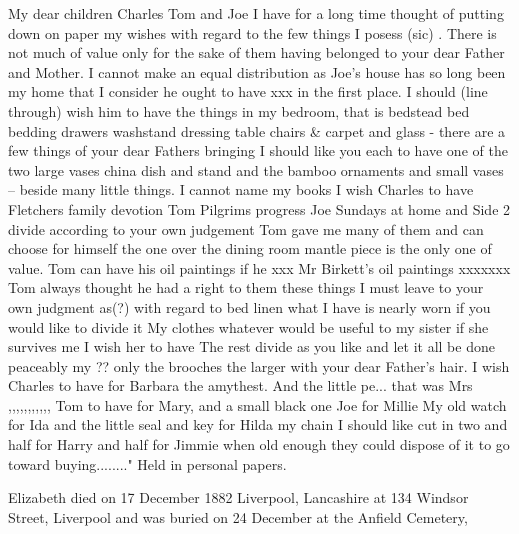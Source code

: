 My dear children Charles Tom and Joe I have for a long time thought of putting down on paper my wishes with regard to the few things I posess (sic) . There is not much of value only for the sake of them having belonged to your dear Father and Mother. I cannot make an equal distribution as Joe’s house has so long been my home that I consider he ought to have xxx in the first place. I should (line through) wish him to have the things in my bedroom, that is bedstead bed bedding drawers washstand dressing table chairs & carpet and glass - there are a few things of your dear Fathers bringing I should like you each to have one of the two large vases china dish and stand and the bamboo ornaments and small vases – beside many little things. I cannot name my books I wish Charles to have Fletchers family devotion Tom Pilgrims progress Joe Sundays at home and
Side 2
divide according to your own judgement Tom gave me many of them and can choose for himself the one over the dining room mantle piece is the only one of value. Tom can have his oil paintings if he xxx Mr Birkett’s oil paintings xxxxxxx Tom always thought he had a right to them these things I must leave to your own judgment as(?) with regard to bed linen what I have is nearly worn if you would like to divide it My clothes whatever would be useful to my sister if she survives me I wish her to have The rest divide as you like and let it all be done peaceably my ?? only the brooches the larger with your dear Father’s hair. I wish Charles to have for Barbara the amythest. And the little pe... that was Mrs ,,,,,,,,,,, Tom to have for Mary, and a small black one Joe for Millie
My old watch for Ida and the little seal and key for Hilda my chain I should like cut in two and half for Harry and half for Jimmie when old enough they could dispose of it to go toward buying........"
Held in personal papers.

Elizabeth died on 17 December 1882 Liverpool, Lancashire at 134 Windsor Street, Liverpool and was buried on 24 December at the Anfield Cemetery, 
